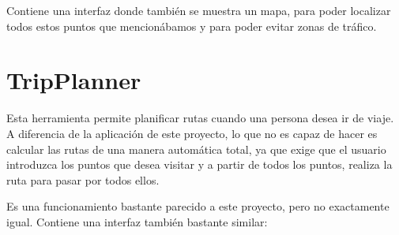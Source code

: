 Contiene una interfaz donde también se muestra un mapa, para poder localizar todos estos puntos que mencionábamos y para poder evitar zonas de tráfico.

\section{TripPlanner}

Esta herramienta \cite{tripplanner} permite planificar rutas cuando una persona desea ir de viaje. A diferencia de la aplicación de este proyecto, lo que no es capaz de hacer es calcular las rutas de una manera automática total, ya que exige que el usuario introduzca los puntos que desea visitar y a partir de todos los puntos, realiza la ruta para pasar por todos ellos.

Es una funcionamiento bastante parecido a este proyecto, pero no exactamente igual. Contiene una interfaz también bastante similar:

